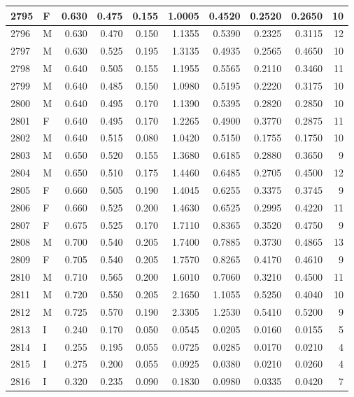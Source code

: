 \documentclass[9pt,twocolumn,twoside,]{pnas-new}
\begin{document}
\begin{tabular}{l|l|r|r|r|r|r|r|r|r}
\hline
2795 & F & 0.630 & 0.475 & 0.155 & 1.0005 & 0.4520 & 0.2520 & 0.2650 & 10\\
\hline
2796 & M & 0.630 & 0.470 & 0.150 & 1.1355 & 0.5390 & 0.2325 & 0.3115 & 12\\
\hline
2797 & M & 0.630 & 0.525 & 0.195 & 1.3135 & 0.4935 & 0.2565 & 0.4650 & 10\\
\hline
2798 & M & 0.640 & 0.505 & 0.155 & 1.1955 & 0.5565 & 0.2110 & 0.3460 & 11\\
\hline
2799 & M & 0.640 & 0.485 & 0.150 & 1.0980 & 0.5195 & 0.2220 & 0.3175 & 10\\
\hline
2800 & M & 0.640 & 0.495 & 0.170 & 1.1390 & 0.5395 & 0.2820 & 0.2850 & 10\\
\hline
2801 & F & 0.640 & 0.495 & 0.170 & 1.2265 & 0.4900 & 0.3770 & 0.2875 & 11\\
\hline
2802 & M & 0.640 & 0.515 & 0.080 & 1.0420 & 0.5150 & 0.1755 & 0.1750 & 10\\
\hline
2803 & M & 0.650 & 0.520 & 0.155 & 1.3680 & 0.6185 & 0.2880 & 0.3650 & 9\\
\hline
2804 & M & 0.650 & 0.510 & 0.175 & 1.4460 & 0.6485 & 0.2705 & 0.4500 & 12\\
\hline
2805 & F & 0.660 & 0.505 & 0.190 & 1.4045 & 0.6255 & 0.3375 & 0.3745 & 9\\
\hline
2806 & F & 0.660 & 0.525 & 0.200 & 1.4630 & 0.6525 & 0.2995 & 0.4220 & 11\\
\hline
2807 & F & 0.675 & 0.525 & 0.170 & 1.7110 & 0.8365 & 0.3520 & 0.4750 & 9\\
\hline
2808 & M & 0.700 & 0.540 & 0.205 & 1.7400 & 0.7885 & 0.3730 & 0.4865 & 13\\
\hline
2809 & F & 0.705 & 0.540 & 0.205 & 1.7570 & 0.8265 & 0.4170 & 0.4610 & 9\\
\hline
2810 & M & 0.710 & 0.565 & 0.200 & 1.6010 & 0.7060 & 0.3210 & 0.4500 & 11\\
\hline
2811 & M & 0.720 & 0.550 & 0.205 & 2.1650 & 1.1055 & 0.5250 & 0.4040 & 10\\
\hline
2812 & M & 0.725 & 0.570 & 0.190 & 2.3305 & 1.2530 & 0.5410 & 0.5200 & 9\\
\hline
2813 & I & 0.240 & 0.170 & 0.050 & 0.0545 & 0.0205 & 0.0160 & 0.0155 & 5\\
\hline
2814 & I & 0.255 & 0.195 & 0.055 & 0.0725 & 0.0285 & 0.0170 & 0.0210 & 4\\
\hline
2815 & I & 0.275 & 0.200 & 0.055 & 0.0925 & 0.0380 & 0.0210 & 0.0260 & 4\\
\hline
2816 & I & 0.320 & 0.235 & 0.090 & 0.1830 & 0.0980 & 0.0335 & 0.0420 & 7\\

\end{tabular}
\end{document}
